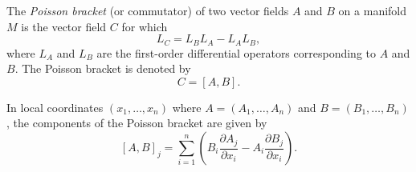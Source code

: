 The \textit{Poisson bracket} (or commutator) of two vector fields $A$ and $B$ on a manifold $M$ is the vector field $C$ for which
$$L_C = L_B L_A - L_A L_B,$$
where $L_A$ and $L_B$ are the first-order differential operators corresponding to $A$ and $B$. The Poisson bracket is denoted by
$$C = [A, B].$$

In local coordinates $(x_1, \ldots, x_n)$ where $A = (A_1, \ldots, A_n)$ and $B = (B_1, \ldots, B_n)$, the components of the Poisson bracket are given by
$$[A, B]_j = \sum_{i=1}^{n} \left( B_i \frac{\partial A_j}{\partial x_i} - A_i \frac{\partial B_j}{\partial x_i} \right).$$
